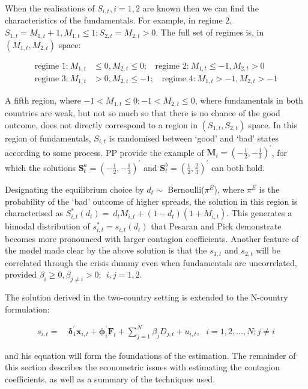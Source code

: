 \documentclass[../base.tex]{subfiles}
\begin{document}
When the realisations of $S_{i,t}, i = 1,2$ are known then we can find the characteristics of the fundamentals. For example, in regime 2, $S_{1,t} = M_{1,t} + 1, M_{1,t} \leq 1; S_{2,t} = M_{2,t} > 0$. The full set of regimes is, in $(M_{1,t}, M_{2,t})$ space:

\begin{align*}
	\text{regime 1:}~ M_{1,t} & \leq	0, M_{2,t} \leq 0; ~~~~ \text{regime 2:}~ M_{1,t} \leq	-1, M_{2,t} > 0 \\
	\text{regime 3:}~ M_{1,t} & >	0, M_{2,t} \leq -1; ~~~~ \text{regime 4:}~ M_{1,t} >	-1, M_{2,t} > -1
\end{align*}

A fifth region, where $-1 < M_{1,t} \leq 0; -1 < M_{2,t} \leq 0$, where fundamentals in both countries are weak, but not so much so that there is no chance of the good outcome, does not directly correspond to a region in $(S_{1,t}, S_{2,t})$ space. In this region of fundamentals, $S_{i,t}$ is randomised between `good' and `bad' states according to some process. PP provide the example of $\mathbf{M}_t = (-\frac{1}{2}, -\frac{1}{3})^\prime$, for which the solutions $\mathbf{S}_t^a = (-\frac{1}{2}, -\frac{1}{3})^\prime$ and $\mathbf{S}_t^b = (\frac{1}{2}, \frac{2}{3})^\prime$ can both hold.

Designating the equilibrium choice by $d_t \sim$ Bernoulli($\pi^E$), where $\pi^E$ is the probability of the `bad' outcome of higher spreads, the solution in this region is characterised as $S_{i,t}^*(d_t) =~d_tM_{i,t} + (1 - d_t)(1 + M_{i,t})$. This generates a bimodal distribution of $s_{i,t}^* = s_{i,t}(d_t)$ that Pesaran and Pick demonstrate becomes more pronounced with larger contagion coefficients. Another feature of the model made clear by the above solution is that the $s_{1,t}$ and $s_{2,t}$ will be correlated through the crisis dummy even when fundamentals are uncorrelated, provided $\beta_i \geq 0, \beta_{j \neq i} > 0;~~ i,j = 1, 2$. 

The solution derived in the two-country setting is extended to the N-country formulation:

\begin{align}
	s_{i,t} =&~\boldsymbol{\delta}_1^{\prime} \mathbf{x}_{i,t} + \boldsymbol{\phi}_i^{\prime} \mathbf{F}_t + \sum_{j=1}^{N}\beta_j D_{j,t} + u_{i,t}, ~~~ i = 1,2,...,N ; j \neq i
	\label{eqn:pp_multi}	
\end{align}

and his equation will form the foundations of the estimation. The remainder of this section describes the econometric issues with estimating the contagion coefficients, as well as a summary of the techniques used. 
\end{document}
